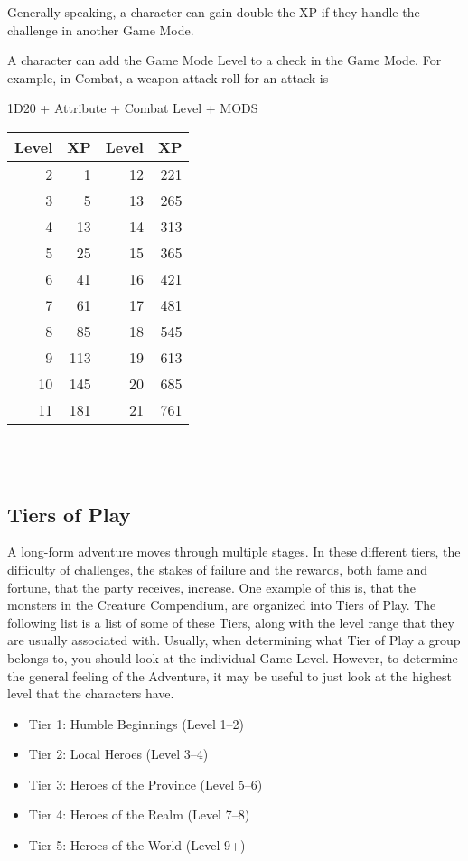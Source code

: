 Generally speaking, a character can gain double the XP if they handle the challenge in another Game Mode.

A character can add the Game Mode Level to a check in the Game Mode.
For example, in Combat, a weapon attack roll for an attack is \\
\begin{center}
	
1D20 + Attribute + Combat Level + MODS\\

\begin{tabular}{r r | r r}
Level & XP & Level & XP\\ \hline
2 & 1 & 12 & 221\\
3 & 5 & 13 & 265\\
4 & 13 & 14 & 313\\
5 & 25 & 15 & 365\\
6 & 41 & 16 & 421\\
7 & 61 & 17 & 481\\
8 & 85 & 18 & 545\\
9 & 113 & 19 & 613\\
10 & 145 & 20 & 685\\
11 & 181 & 21 & 761\\
\end{tabular}\\~\\

\end{center}

\subsection{Tiers of Play}\label{subsec:tiersOfPlay}
A long-form adventure moves through multiple stages.
In these different tiers, the difficulty of challenges, the stakes of failure and the rewards, both fame and fortune, that the party receives, increase.
One example of this is, that the monsters in the Creature Compendium, are organized into Tiers of Play.
The following list is a list of some of these Tiers, along with the level range that they are usually associated with.
Usually, when determining what Tier of Play a group belongs to, you should look at the individual Game Level.
However, to determine the general feeling of the Adventure, it may be useful to just look at the highest level that the characters have.

\begin{itemize}
	\item Tier 1: Humble Beginnings (Level 1--2)
	\item Tier 2: Local Heroes (Level 3--4)
	\item Tier 3: Heroes of the Province (Level 5--6)
	\item Tier 4: Heroes of the Realm (Level 7--8)
	\item Tier 5: Heroes of the World (Level 9+)
\end{itemize}

